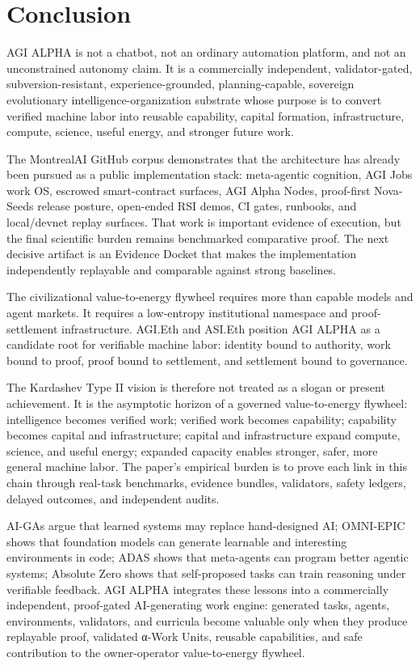 \documentclass[
  11pt,
]{article}
\begin{document}
\section{Conclusion}\label{conclusion}

AGI ALPHA is not a chatbot, not an ordinary automation platform, and not
an unconstrained autonomy claim. It is a commercially independent,
validator-gated, subversion-resistant, experience-grounded,
planning-capable, sovereign evolutionary intelligence-organization
substrate whose purpose is to convert verified machine labor into
reusable capability, capital formation, infrastructure, compute,
science, useful energy, and stronger future work.

The MontrealAI GitHub corpus demonstrates that the architecture has
already been pursued as a public implementation stack: meta-agentic
cognition, AGI Jobs work OS, escrowed smart-contract surfaces, AGI Alpha
Nodes, proof-first Nova-Seeds release posture, open-ended RSI demos, CI
gates, runbooks, and local/devnet replay surfaces. That work is
important evidence of execution, but the final scientific burden remains
benchmarked comparative proof. The next decisive artifact is an Evidence
Docket that makes the implementation independently replayable and
comparable against strong baselines.

The civilizational value-to-energy flywheel requires more than capable
models and agent markets. It requires a low-entropy institutional
namespace and proof-settlement infrastructure. AGI.Eth and ASI.Eth
position AGI ALPHA as a candidate root for verifiable machine labor:
identity bound to authority, work bound to proof, proof bound to
settlement, and settlement bound to governance.

The Kardashev Type II vision is therefore not treated as a slogan or
present achievement. It is the asymptotic horizon of a governed
value-to-energy flywheel: intelligence becomes verified work; verified
work becomes capability; capability becomes capital and infrastructure;
capital and infrastructure expand compute, science, and useful energy;
expanded capacity enables stronger, safer, more general machine labor.
The paper's empirical burden is to prove each link in this chain through
real-task benchmarks, evidence bundles, validators, safety ledgers,
delayed outcomes, and independent audits.

AI-GAs argue that learned systems may replace hand-designed AI;
OMNI-EPIC shows that foundation models can generate learnable and
interesting environments in code; ADAS shows that meta-agents can
program better agentic systems; Absolute Zero shows that self-proposed
tasks can train reasoning under verifiable feedback. AGI ALPHA
integrates these lessons into a commercially independent, proof-gated
AI-generating work engine: generated tasks, agents, environments,
validators, and curricula become valuable only when they produce
replayable proof, validated α-Work Units, reusable capabilities, and
safe contribution to the owner-operator value-to-energy flywheel.
\end{document}
